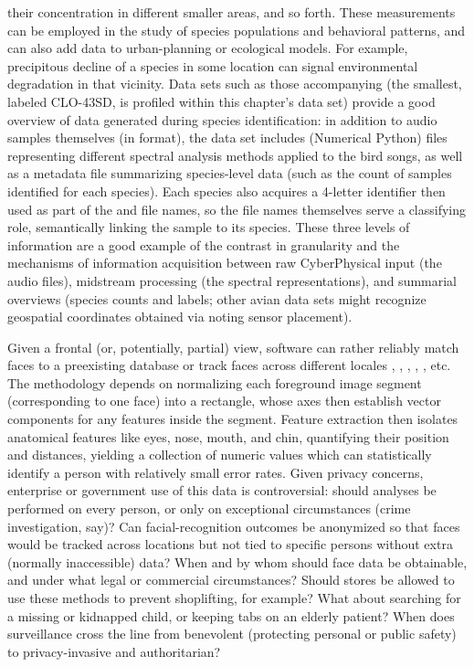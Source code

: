 {\begin{description}
their concentration in different smaller areas, and so forth.  
These measurements can be employed in the study of 
species populations and behavioral patterns, and can 
also add data to urban-planning or ecological models.  
For example, precipitous decline of a species in some 
location can signal environmental degradation in that vicinity.   
\pseudoIndent{}
Data sets such as those accompanying \cite{JustinSalamon} 
(the smallest, labeled CLO-43SD, is profiled within 
this chapter's data set)   
provide a good overview of data generated during 
species identification: in addition to audio 
samples themselves (in \WAV{} format), the data set 
includes \NPY{} (Numerical Python) files representing 
different spectral analysis methods applied 
to the bird songs, as well as a metadata file 
summarizing species-level data (such as the count 
of samples identified for each species).  
Each species also acquires a 4-letter identifier then used 
as part of the \WAV{} and \NPY{} file names, so the 
file names themselves serve a classifying role, 
semantically linking the sample to its species.  
These three levels of information are a good 
example of the contrast in granularity 
\mdash{} and the mechanisms of information acquisition 
\mdash{} between raw CyberPhysical input (the audio files), midstream 
processing (the spectral representations), and 
summarial overviews (species counts and labels;   
other avian data sets might recognize 
geospatial coordinates obtained via noting sensor placement).
 
\item[Facial Recognition]  Given a frontal (or, potentially, 
partial) view, software can 
rather reliably match faces to a preexisting database or 
track faces across different locales \cite{WeiLunChao},
\cite{YueqiDuan}, \cite{GaryHuang}, 
\cite{KalaiselviNithya}, \cite{FengLu}, etc.  
The methodology depends 
on normalizing each foreground image segment (corresponding to 
one face) into a rectangle, whose axes then establish vector 
components for any features inside the segment.  Feature extraction 
then isolates anatomical features like eyes, nose, mouth, and 
chin, quantifying their position and distances, yielding a 
collection of numeric values which can statistically 
identify a person with relatively small error rates.  
\pseudoIndent{}
Given privacy concerns, enterprise or government use 
of this data is controversial: should analyses be performed 
on every person, or only on exceptional circumstances 
(crime investigation, say)?  Can facial-recognition outcomes 
be anonymized so that faces would be tracked across locations 
but not tied to specific persons without extra (normally 
inaccessible) data?  When and by whom should face data be 
obtainable, and under what legal or commercial circumstances?  
Should stores be allowed to use these methods to 
prevent shoplifting, for example?  What about searching 
for a missing or kidnapped child, or keeping tabs on an 
elderly patient?  When does surveillance cross the line 
from benevolent (protecting personal or public safety) 
to privacy-invasive and authoritarian?
\end{description}
}
